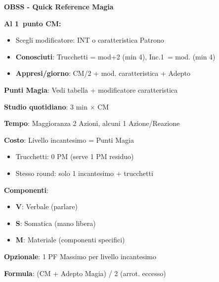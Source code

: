 \documentclass[10pt,a4paper,landscape]{article}
\begin{document}
	
	\begin{center}
		{\Huge\textbf{OBSS - Quick Reference Magia}}
	\end{center}
	
	\begin{multicols}{3}
		
		
		\begin{tcolorbox}[title=SETUP INIZIALE]
			\textbf{Al 1\textordmasculine\ punto CM:}
			\begin{itemize}[leftmargin=*,noitemsep]
				\item Scegli modificatore: INT o caratteristica Patrono
				\item \textbf{Conosciuti}: Trucchetti = mod+2 (min 4), Inc.1\textordmasculine\ = mod. (min 4)
				\item \textbf{Appresi/giorno}: CM/2 + mod. caratteristica + Adepto
			\end{itemize}
			
			\textbf{Punti Magia}: Vedi tabella + modificatore caratteristica
			
			\textbf{Studio quotidiano}: 3 min $\times$ CM
		\end{tcolorbox}
		
		\begin{tcolorbox}[title=LANCIO INCANTESIMI]
			\textbf{Tempo}: Maggioranza 2 Azioni, alcuni 1 Azione/Reazione
			
			\textbf{Costo}: Livello incantesimo = Punti Magia
			\begin{itemize}[leftmargin=*,noitemsep]
				\item Trucchetti: 0 PM (serve 1 PM residuo)
				\item Stesso round: solo 1 incantesimo + trucchetti
			\end{itemize}
			
			\textbf{Componenti}:
			\begin{itemize}[leftmargin=*,noitemsep]
				\item \textbf{V}: Verbale (parlare)
				\item \textbf{S}: Somatica (mano libera)
				\item \textbf{M}: Materiale (componenti specifici)
			\end{itemize}
			
			\textbf{Opzionale}: 1 PF Massimo per livello incantesimo
		\end{tcolorbox}
		
		\begin{tcolorbox}[title=MASSIMO LIVELLO INCANTESIMI]
			\textbf{Formula}: (CM + Adepto Magia) / 2 (arrot. eccesso)
			

\end{tcolorbox}
\end{multicols}
\end{document}
